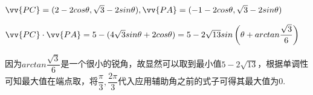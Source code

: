 \begin{enumerate}
\begin{jieda}
        $\vv{PC} = (2-2cos\theta, \sqrt{3}-2sin\theta), \vv{PA} = (-1-2cos\theta, \sqrt{3}-2sin\theta)$

        $\vv{PC} \cdot \vv{PA} = 5-(4\sqrt{3}sin\theta+2cos\theta) = 5-2\sqrt{13}sin\left(\theta + arctan\dfrac{\sqrt{3}}{6}\right)$

        因为$arctan\dfrac{\sqrt{3}}{6}$是一个很小的锐角，故显然可以取到最小值$5-2\sqrt{13}$，根据单调性可知最大值在端点取，将$\dfrac{\pi}{3}, \dfrac{2\pi}{3}$代入应用辅助角之前的式子可得其最大值为0.
    \end{jieda}
\end{enumerate}
